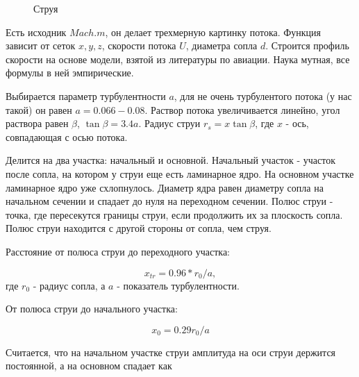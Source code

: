 \documentclass[a4paper,12pt,fleqn]{extreport} %
\begin{document}
\begin{figure}[h]
	\caption{Струя}
	\label{ris:image}
\end{figure}


Есть исходник $Mach.m$, он делает трехмерную картинку потока. Функция зависит от сеток $x,y,z$, скорости потока $U$, диаметра сопла $d$. Строится профиль скорости на основе модели, взятой из литературы по авиации. Наука мутная, все формулы в ней эмпирические.

Выбирается параметр турбулентности $a$, для не очень турбулентого потока (у нас такой) он равен $a = 0.066-0.08$. Раствор потока увеличивается линейно, угол раствора равен $\beta$, $\tan \beta = 3.4 a$. Радиус струи $r_{s} = x \tan\beta$, где $x$ - ось, совпадающая с осью потока.

Делится на два участка: начальный и основной. Начальный участок - участок после сопла, на котором у струи еще есть ламинарное ядро. На основном участке ламинарное ядро уже схлопнулось. Диаметр ядра равен диаметру сопла на начальном сечении и спадает до нуля на переходном сечении. Полюс струи - точка, где пересекутся границы струи, если продолжить их за плоскость сопла. Полюс струи находится с другой стороны от сопла, чем струя.

Расстояние от полюса струи до переходного участка:

\begin{equation}
x_{tr} = 0.96*r_0/a,
\end{equation}
где $r_0$ - радиус сопла, а $a$ - показатель турбулентности.

От полюса струи до начального участка:

\begin{equation}
x_0 = 0.29 r_0/a
\end{equation}

Считается, что на начальном участке струи амплитуда на оси струи держится постоянной, а на основном спадает как
\end{document}
